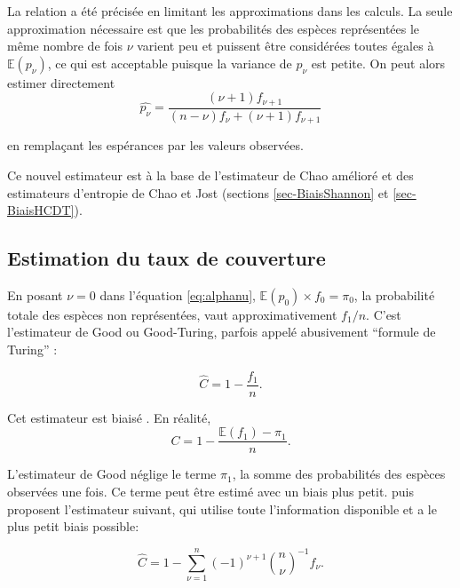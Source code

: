 \documentclass[
  11pt,
  american,
  a4paper,
  extrafontsizes,onecolumn,openright
  ]{memoir}
\newlength{\rf}
\begin{document}
La relation a été précisée \autocite[eq. 6 et 7a]{Chiu2014a} en limitant les approximations dans les calculs.
La seule approximation nécessaire est que les probabilités des espèces représentées le même nombre de fois \(\nu\) varient peu et puissent être considérées toutes égales à \({\mathbb E}(p_\nu)\), ce qui est acceptable puisque la variance de \(p_\nu\) est petite.
On peut alors estimer directement
\begin{equation}
  \label{eq:GoodTuring2014}
   \hat{p_\nu} 
   = \frac{\left( \nu + 1 \right) f_{\nu + 1}}{\left(n - \nu \right) f_{\nu} + \left(\nu + 1 \right) f_{\nu + 1}}
\end{equation}

en remplaçant les espérances par les valeurs observées.

Ce nouvel estimateur est à la base de l'estimateur de Chao amélioré et des estimateurs d'entropie de Chao et Jost (sections \ref{sec-BiaisShannon} et \ref{sec-BiaisHCDT}).

\hypertarget{estimation-du-taux-de-couverture}{%
\subsection{Estimation du taux de couverture}\label{estimation-du-taux-de-couverture}}

En posant \(\nu=0\) dans l'équation \eqref{eq:alphanu}, \({\mathbb E}(p_0) \times f_{0} = \pi_0\), la probabilité totale des espèces non représentées, vaut approximativement \(f_{1}/n\).
C'est l'estimateur de Good ou Good-Turing, parfois appelé abusivement \enquote{formule de Turing} \autocite{Zhang2007}:

\begin{equation}
  \label{eq:CGood}
  \hat{C} = 1 - \frac{f_1}{n}.
\end{equation}

Cet estimateur est biaisé \autocite{Zhang2007}. En réalité,
\begin{equation}
  \label{eq:CsansBiais}
  C = 1 - \frac{{\mathbb E}(f_1) - \pi_1}{n}.
\end{equation}

L'estimateur de Good néglige le terme \(\pi_1\), la somme des probabilités des espèces observées une fois.
Ce terme peut être estimé avec un biais plus petit.
\textcite{Chao1988} puis \textcite{Zhang2007} proposent l'estimateur suivant, qui utilise toute l'information disponible et a le plus petit biais possible:

\begin{equation}
  \label{eq:CZhang}
  \hat{C} = 1 - \sum^{n}_{\nu = 1}{\left( -1 \right)}^{\nu + 1}{\binom{n}{\nu}}^{-1}f_\nu.
\end{equation}
\end{document}
